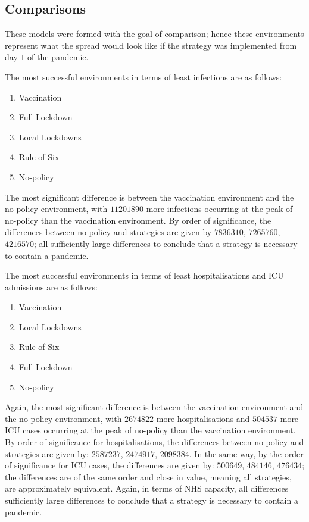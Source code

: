 \documentclass[11pt]{article}
\begin{document}
\subsection{Comparisons}
These models were formed with the goal of comparison; hence these environments represent what the spread would look like if the strategy was implemented from day $1$ of the pandemic. \par
The most successful environments in terms of least infections are as follows:
\begin{enumerate}
\item Vaccination
\item Full Lockdown
\item Local Lockdowns
\item Rule of Six
\item No-policy
\end{enumerate}
The most significant difference is between the vaccination environment and the no-policy environment, with $11201890$ more infections occurring at the peak of no-policy than the vaccination environment. By order of significance, the differences between no policy and strategies are given by $7836310$, $ 7265760$, $ 4216570$; all sufficiently large differences to conclude that a strategy is necessary to contain a pandemic. \par
The most successful environments in terms of least hospitalisations and ICU admissions are as follows:
\begin{enumerate}
\item Vaccination
\item Local Lockdowns
\item Rule of Six
\item Full Lockdown
\item No-policy
\end{enumerate}
Again, the most significant difference is between the vaccination environment and the no-policy environment, with $2674822$ more hospitalisations and $504537$ more ICU cases occurring at the peak of no-policy than the vaccination environment. By order of significance for hospitalisations, the differences between no policy and strategies are given by: $ 2587237$, $ 2474917$, $ 2098384$. In the same way, by the order of significance for ICU cases, the differences are given by: $ 500649$, $ 484146$, $476434$; the differences are of the same order and close in value, meaning all strategies, are approximately equivalent. Again, in terms of NHS capacity, all differences sufficiently large differences to conclude that a strategy is necessary to contain a pandemic. \par
\end{document}
